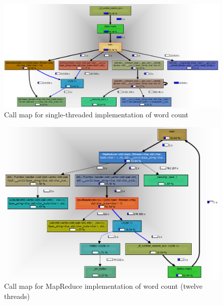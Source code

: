 \documentclass[12pt, letterpaper]{article}
\begin{document}
\newpage
	\begin{figure}[h]
	\centering
	\includegraphics[width=1.35\textwidth, angle=90]{call-graph-part3-final-cropped}
	\caption{Call map for single-threaded implementation of word count\label{fig:callMapSingleImpl}}
	\end{figure}
\newpage
	\begin{figure}[h]
	\centering
	\includegraphics[width=1.35\textwidth, angle=90]{call-graph-part4-final-cropped}
	\caption{Call map for MapReduce implementation of word count (twelve threads)\label{fig:callMapMRImpl}}
	\end{figure}
\end{document}
